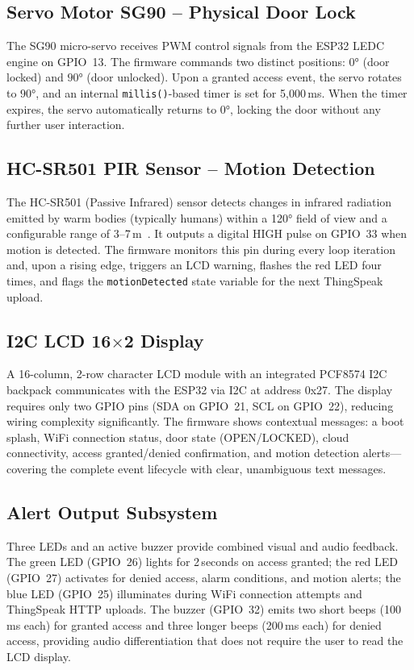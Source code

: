 \documentclass[12pt,a4paper]{article}
\begin{document}
\subsection{Servo Motor SG90 -- Physical Door Lock}

The SG90 micro-servo receives PWM control signals from the ESP32 LEDC
engine on GPIO~13. The firmware commands two distinct positions:
$0°$ (door locked) and $90°$ (door unlocked). Upon a granted access
event, the servo rotates to $90°$, and an internal \texttt{millis()}-based
timer is set for 5,000\,ms. When the timer expires, the servo
automatically returns to $0°$, locking the door without any further
user interaction.

\subsection{HC-SR501 PIR Sensor -- Motion Detection}

The HC-SR501 (Passive Infrared) sensor detects changes in infrared
radiation emitted by warm bodies (typically humans) within a 120°
field of view and a configurable range of 3--7\,m~\cite{hcsr501ds2019}.
It outputs a digital HIGH pulse on GPIO~33 when motion is detected.
The firmware monitors this pin during every loop iteration and, upon
a rising edge, triggers an LCD warning, flashes the red LED four
times, and flags the \texttt{motionDetected} state variable for the
next ThingSpeak upload.

\subsection{I2C LCD 16$\times$2 Display}

A 16-column, 2-row character LCD module with an integrated
PCF8574 I2C backpack communicates with the ESP32 via I2C at
address 0x27. The display requires only two GPIO pins (SDA on
GPIO~21, SCL on GPIO~22), reducing wiring complexity
significantly. The firmware shows contextual messages:
a boot splash, WiFi connection status, door state (OPEN/LOCKED),
cloud connectivity, access granted/denied confirmation, and
motion detection alerts---covering the complete event lifecycle
with clear, unambiguous text messages.

\subsection{Alert Output Subsystem}

Three LEDs and an active buzzer provide combined visual and audio
feedback. The green LED (GPIO~26) lights for 2\,seconds on access
granted; the red LED (GPIO~27) activates for denied access, alarm
conditions, and motion alerts; the blue LED (GPIO~25) illuminates
during WiFi connection attempts and ThingSpeak HTTP uploads.
The buzzer (GPIO~32) emits two short beeps (100\,ms each) for
granted access and three longer beeps (200\,ms each) for denied
access, providing audio differentiation that does not require
the user to read the LCD display.
\end{document}
